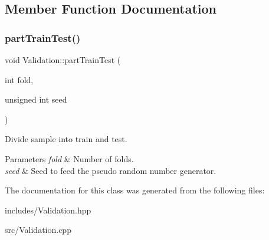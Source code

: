 \subsection{Member Function Documentation}
\mbox{\label{class_validation_a83b3cc552927fe8595f3cdd143d645c0}} 
\subsubsection{\texorpdfstring{part\+Train\+Test()}{partTrainTest()}}
{\footnotesize\ttfamily void Validation\+::part\+Train\+Test (\begin{DoxyParamCaption}\item[{int}]{fold,  }\item[{unsigned int}]{seed }\end{DoxyParamCaption})}



Divide sample into train and test. 


\begin{DoxyParams}{Parameters}
{\em fold} & Number of folds. \\
\hline
{\em seed} & Seed to feed the pseudo random number generator. \\
\hline
\end{DoxyParams}


The documentation for this class was generated from the following files\+:\begin{DoxyCompactItemize}
\item 
includes/Validation.\+hpp\item 
src/Validation.\+cpp\end{DoxyCompactItemize}
